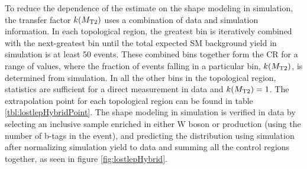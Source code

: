 To reduce the dependence of the estimate on the \mttwo shape modeling in simulation, the transfer factor $k(M_{\mathrm{T2}})$ uses a combination of data and simulation information. In each topological region, the greatest \mttwo bin is iteratively combined with the next-greatest bin until the total expected SM background yield in simulation is at least 50 events. These combined bins together form the CR for a range of \mttwo values, where the fraction of events falling in a particular \mttwo bin, $k(M_{\mathrm{T2}})$, is determined from simulation. In all the other \mttwo bins in the topological region, statistics are sufficient for a direct measurement in data and $k(M_{\mathrm{T2}})=1$. The extrapolation point for each topological region can be found in table \ref{tbl:lostlepHybridPoint}. The shape modeling in simulation is verified in data by selecting an inclusive sample enriched in either W boson or \ttbar production (using the number of b-tags in the event), and predicting the \mttwo distribution using simulation after normalizing simulation yield to data and summing all the control regions together, as seen in figure \ref{fig:lostlepHybrid}.
